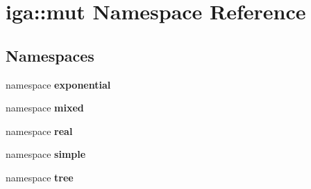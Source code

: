 \section{iga::mut Namespace Reference}
\label{namespaceiga_1_1mut}


\subsection*{Namespaces}
\begin{CompactItemize}
\item 
namespace {\bf exponential}
\item 
namespace {\bf mixed}
\item 
namespace {\bf real}
\item 
namespace {\bf simple}
\item 
namespace {\bf tree}
\end{CompactItemize}
